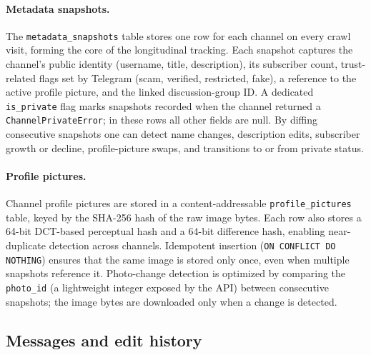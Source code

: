 \paragraph{Metadata snapshots.}
The \texttt{metadata\_snapshots} table stores one row for each channel on every crawl visit, forming the core of the longitudinal tracking.
Each snapshot captures the channel's public identity (username, title, description), its subscriber count, trust-related flags set by Telegram (scam, verified, restricted, fake), a reference to the active profile picture, and the linked discussion-group ID.
A dedicated \texttt{is\_private} flag marks snapshots recorded when the channel returned a \texttt{ChannelPrivateError}; in these rows all other fields are null.
By diffing consecutive snapshots one can detect name changes, description edits, subscriber growth or decline, profile-picture swaps, and transitions to or from private status.

\paragraph{Profile pictures.}
Channel profile pictures are stored in a content-addressable \texttt{profile\_pictures} table, keyed by the SHA-256 hash of the raw image bytes.
Each row also stores a 64-bit DCT-based perceptual hash and a 64-bit difference hash, enabling near-duplicate detection across channels.
Idempotent insertion (\texttt{ON CONFLICT DO NOTHING}) ensures that the same image is stored only once, even when multiple snapshots reference it.
Photo-change detection is optimized by comparing the \texttt{photo\_id} (a lightweight integer exposed by the API) between consecutive snapshots; the image bytes are downloaded only when a change is detected.

\subsection{Messages and edit history}

